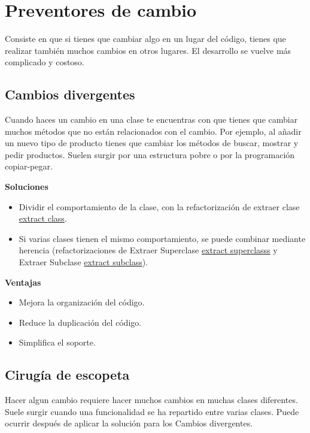 \documentclass[11pt,a4paper,oneside]{book}
\begin{document}

\section{Preventores de cambio}

Consiste en que si tienes que cambiar algo en un lugar del código, tienes que realizar también muchos cambios en otros lugares. El desarrollo se vuelve más complicado y costoso.

\subsection{Cambios divergentes}
\label{cambiosdivergentes}
Cuando haces un cambio en una clase te encuentras con que tienes que cambiar muchos métodos que no están relacionados con el cambio. Por ejemplo, al añadir un nuevo tipo de producto tienes que cambiar los métodos de buscar, mostrar y pedir productos.
\newline
Suelen surgir por una estructura pobre o por la programación copiar-pegar.

\textbf{Soluciones}
\begin{itemize}
    \item Dividir el comportamiento de la clase, con la refactorización de extraer clase  \hyperref[extractclass]{extract class}.
    \item Si varias clases tienen el mismo comportamiento, se puede combinar mediante herencia (refactorizaciones de Extraer Superclase \hyperref[extractsuperclass]{extract superclasss} y Extraer Subclase \hyperref[extractsubclass]{extract subclass}).
\end{itemize} 

\textbf{Ventajas}
\begin{itemize}
    \item Mejora la organización del código.
    \item Reduce la duplicación del código.
    \item Simplifica el soporte.
\end{itemize}

\subsection{Cirugía de escopeta}
Hacer algun cambio requiere hacer muchos cambios en muchas clases diferentes.
\newline
Suele surgir cuando una funcionalidad se ha repartido entre varias clases. Puede ocurrir después de aplicar la solución para los Cambios divergentes.
\end{document}
